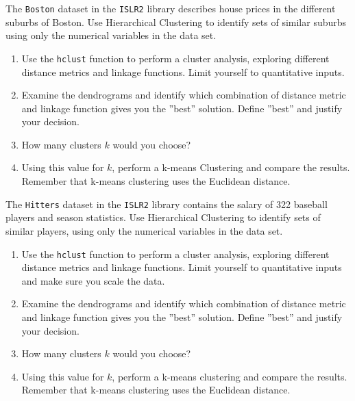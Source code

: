 \begin{withcode}
\begin{exerciseboxcomputer}
The \texttt{Boston} dataset in the \texttt{ISLR2} library describes house prices in the different suburbs of Boston. Use Hierarchical Clustering to identify sets of similar suburbs using only the numerical variables in the data set.
\begin{enumerate}
   \item Use the \texttt{hclust} function to perform a cluster analysis, exploring different distance metrics and linkage functions. Limit yourself to quantitative inputs.
   \item Examine the dendrograms and identify which combination of distance metric and linkage function gives you the ''best'' solution. Define ''best'' and justify your decision.
   \item How many clusters $k$ would you choose?
   \item Using this value for $k$, perform a k-means Clustering and compare the results. Remember that k-means clustering uses the Euclidean distance.
\end{enumerate}
\end{exerciseboxcomputer}

\begin{exerciseboxcomputer}

The \texttt{Hitters} dataset in the \texttt{ISLR2} library contains the salary of 322 baseball players and season statistics. Use Hierarchical Clustering to identify sets of similar players, using only the numerical variables in the data set.

\begin{enumerate}
   \item Use the \texttt{hclust} function to perform a cluster analysis, exploring different distance metrics and linkage functions. Limit yourself to quantitative inputs and make sure you scale the data.
   \item Examine the dendrograms and identify which combination of distance metric and linkage function gives you the ''best'' solution. Define ''best'' and justify your decision.
   \item How many clusters $k$ would you choose?
   \item Using this value for $k$, perform a k-means clustering and compare the results. Remember that k-means clustering uses the Euclidean distance.
\end{enumerate}
\end{exerciseboxcomputer}

\begin{exerciseboxcomputer}


\end{exerciseboxcomputer}
\end{withcode}
